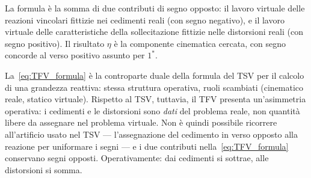 La formula è la somma di due contributi di segno opposto:
il lavoro virtuale delle reazioni vincolari fittizie nei
cedimenti reali (con segno negativo), e il lavoro virtuale
delle caratteristiche della sollecitazione fittizie nelle
distorsioni reali (con segno positivo). Il risultato
$\eta$ è la componente cinematica cercata, con segno
concorde al verso positivo assunto per $1^*$.


\begin{oss}
	La~\eqref{eq:TFV_formula} è la controparte duale della
	formula del TSV per il calcolo di una grandezza reattiva:
	stessa struttura operativa, ruoli scambiati (cinematico
	reale, statico virtuale). Rispetto al TSV, tuttavia, il
	TFV presenta un'asimmetria operativa: i cedimenti e le
	distorsioni sono \emph{dati} del problema reale, non
	quantità libere da assegnare nel problema virtuale. Non
	è quindi possibile ricorrere all'artificio usato nel TSV
	--- l'assegnazione del cedimento in verso opposto alla
	reazione per uniformare i segni --- e i due contributi
	nella~\eqref{eq:TFV_formula} conservano segni opposti.
	Operativamente: dai cedimenti si sottrae, alle
	distorsioni si somma.
\end{oss}


